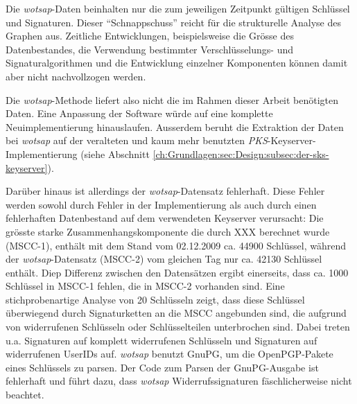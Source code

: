 Die \emph{wotsap}-Daten beinhalten nur die zum jeweiligen Zeitpunkt
gültigen Schlüssel und Signaturen. Dieser "`Schnappschuss"' reicht für
die strukturelle Analyse des Graphen aus. Zeitliche Entwicklungen,
beispielsweise die Grösse des Datenbestandes, die Verwendung
bestimmter Verschlüsselungs- und Signaturalgorithmen und die Entwicklung
einzelner Komponenten können damit aber nicht nachvollzogen werden.

Die \emph{wotsap}-Methode liefert also nicht die im Rahmen dieser
Arbeit benötigten Daten. Eine Anpassung der Software würde auf eine
komplette Neuimplementierung hinauslaufen. Ausserdem beruht die
Extraktion der Daten bei \emph{wotsap} auf der veralteten und kaum
mehr benutzten \emph{PKS}-Keyserver-Implementierung (siehe Abschnitt
\ref{ch:Grundlagen:sec:Design:subsec:der-sks-keyserver}).

Darüber hinaus ist allerdings der \emph{wotsap}-Datensatz
fehlerhaft. Diese Fehler werden sowohl durch Fehler in der
Implementierung als auch durch einen fehlerhaften Datenbestand auf dem
verwendeten Keyserver verursacht: Die grösste starke
Zusammenhangskomponente die durch XXX berechnet %
wurde (MSCC-1), enthält mit dem Stand vom 02.12.2009 ca. 44900
Schlüssel, während der \emph{wotsap}-Datensatz (MSCC-2) vom gleichen
Tag nur ca. 42130 Schlüssel enthält. Diep Differenz zwischen den
Datensätzen ergibt einerseits, dass ca. 1000 Schlüssel in MSCC-1
fehlen, die in MSCC-2 vorhanden sind. Eine stichprobenartige Analyse
von 20 Schlüsseln zeigt, dass diese Schlüssel überwiegend durch
Signaturketten an die MSCC angebunden sind, die aufgrund von
widerrufenen Schlüsseln oder Schlüsselteilen unterbrochen sind. Dabei
treten u.a. Signaturen auf komplett widerrufenen Schlüsseln und
Signaturen auf widerrufenen UserIDs auf. \emph{wotsap} benutzt GnuPG,
um die OpenPGP-Pakete eines Schlüssels zu parsen. Der Code zum Parsen
der GnuPG-Ausgabe ist fehlerhaft und führt dazu, dass \emph{wotsap}
Widerrufssignaturen fäschlicherweise nicht beachtet.

